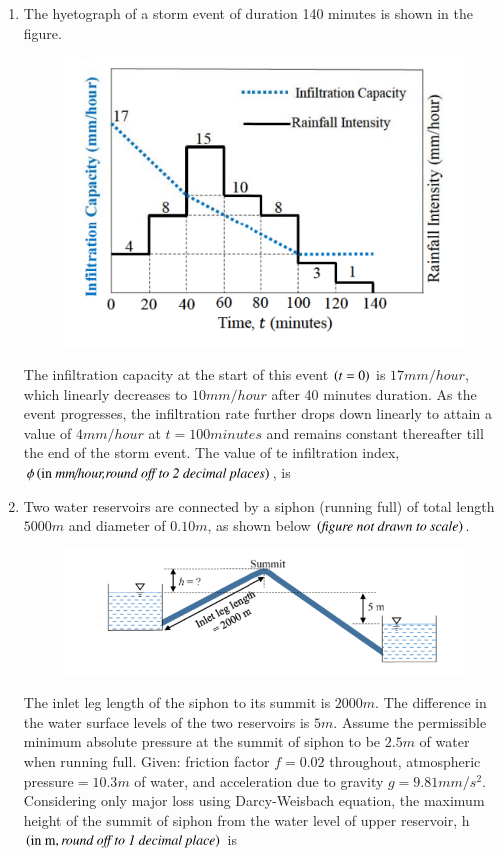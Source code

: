 \documentclass[journal,12pt,onecolumn]{IEEEtran}
\theoremstyle{remark}
\begin{document}
\begin{enumerate}
\hfill{}

\item The hyetograph of a storm event of duration 140 minutes is shown in the figure.

\begin{figure}[H]
\centering
\includegraphics[width=0.5\columnwidth]{figs/q49.png}
\caption*{}
\label{fig:Q.49}
\end{figure}
The infiltration capacity at the start of this event $\left(t=0\right)$ is $17mm/hour$, which linearly decreases to $10mm/hour$ after 40 minutes duration. As the event progresses, the infiltration rate further drops down linearly to attain a value of $4mm/hour$ at $t=100 minutes$ and remains constant thereafter till the end of the storm event. The value of te infiltration index, $\phi\left(\text{in }\textit{mm/hour,round off to 2 decimal places}\right)$, is \underline{\hspace{2cm}}

\hfill{}

\item  Two water reservoirs are connected by a siphon (running full) of total length $5000 m$ and diameter of $0.10 m$, as shown below $\left(\textit{figure not drawn to scale}\right)$.

\begin{figure}[H]
\centering
\includegraphics[width=0.5\columnwidth]{figs/q50.png}
\caption*{}
\label{fig:Q.50}
\end{figure}
The inlet leg length of the siphon to its summit is $2000 m$. The difference in the water surface levels of the two reservoirs is $5 m$. Assume the permissible minimum absolute pressure at the summit of siphon to be $2.5 m$ of water when running full. Given: friction factor $f =0.02$ throughout, atmospheric pressure$ = 10.3m$ of water, and acceleration due to gravity $g=9.81mm/s^2$. Considering only major loss using Darcy-Weisbach equation, the maximum height of the summit of siphon from the water level of upper reservoir, h $\left(\text{in m}, \textit{round off to 1 decimal place}\right)$ is \underline{\hspace{2cm}}


\end{enumerate}
\end{document}
